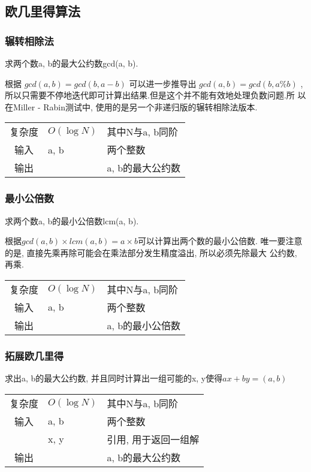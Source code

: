     \subsection{欧几里得算法}\small


        \subsubsection{辗转相除法}\small
求两个数a, b的最大公约数gcd(a, b).

根据 $gcd(a, b) = gcd(b, a - b)$ 可以进一步推导出 $gcd(a, b) = gcd(b, a \% b)$ 
, 所以只需要不停地迭代即可计算出结果.但是这个并不能有效地处理负数问题.所
以在Miller - Rabin测试中, 使用的是另一个非递归版的辗转相除法版本.
\begin{longtable}{|c|l|l|}
复杂度 & $O(\log N)$ & 其中N与a, b同阶  \\
输入 & a, b & 两个整数 \\
输出 &  & a, b的最大公约数 \\
\end{longtable}



        \subsubsection{最小公倍数}\small
求两个数a, b的最小公倍数lcm(a, b).

根据$gcd(a, b) \times lcm(a, b) = a \times b$可以计算出两个数的最小公倍数.
唯一要注意的是, 直接先乘再除可能会在乘法部分发生精度溢出, 所以必须先除最大
公约数, 再乘.
\begin{longtable}{|c|l|l|}
复杂度 & $O(\log N)$ & 其中N与a, b同阶  \\
输入 & a, b & 两个整数 \\
输出 &  & a, b的最小公倍数 \\
\end{longtable}



        \subsubsection{拓展欧几里得}\small
求出a, b的最大公约数, 并且同时计算出一组可能的x, y使得$ax + by = (a, b)$
\begin{longtable}{|c|l|l|}
复杂度 & $O(\log N)$ & 其中N与a, b同阶  \\
输入 & a, b & 两个整数 \\
 & x, y & 引用, 用于返回一组解 \\
输出 &  & a, b的最大公约数 \\
\end{longtable}



